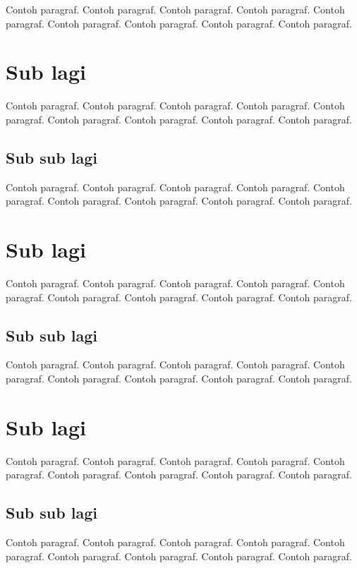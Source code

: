 \documentclass[a4paper,twoside,bahasa,nobib]{tufte-book}
\begin{document}
Contoh paragraf. Contoh paragraf. Contoh paragraf. Contoh paragraf.
Contoh paragraf. Contoh paragraf. Contoh paragraf. Contoh paragraf.
Contoh paragraf.


\section{Sub lagi}

Contoh paragraf. Contoh paragraf. Contoh paragraf. Contoh paragraf.
Contoh paragraf. Contoh paragraf. Contoh paragraf. Contoh paragraf.
Contoh paragraf.

\subsection{Sub sub lagi}

Contoh paragraf. Contoh paragraf. Contoh paragraf. Contoh paragraf.
Contoh paragraf. Contoh paragraf. Contoh paragraf. Contoh paragraf.
Contoh paragraf.


\section{Sub lagi}

Contoh paragraf. Contoh paragraf. Contoh paragraf. Contoh paragraf.
Contoh paragraf. Contoh paragraf. Contoh paragraf. Contoh paragraf.
Contoh paragraf.

\subsection{Sub sub lagi}

Contoh paragraf. Contoh paragraf. Contoh paragraf. Contoh paragraf.
Contoh paragraf. Contoh paragraf. Contoh paragraf. Contoh paragraf.
Contoh paragraf.

\section{Sub lagi}

Contoh paragraf. Contoh paragraf. Contoh paragraf. Contoh paragraf.
Contoh paragraf. Contoh paragraf. Contoh paragraf. Contoh paragraf.
Contoh paragraf.

\subsection{Sub sub lagi}

Contoh paragraf. Contoh paragraf. Contoh paragraf. Contoh paragraf.
Contoh paragraf. Contoh paragraf. Contoh paragraf. Contoh paragraf.
Contoh paragraf.
\end{document}
